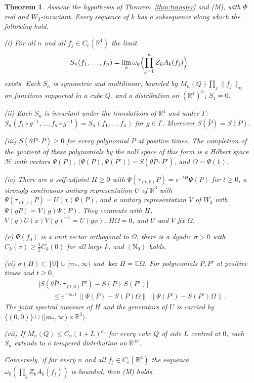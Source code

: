 \documentclass[aps,prd,twocolumn,superscriptaddress,nofootinbib,longbibliography,floatfix,amsmath,amssymb,10pt]{revtex4-2}
\newtheorem{theorem}{Theorem}
\theoremstyle{definition}
\theoremstyle{remark}
\newcommand{\R}{\mathbb{R}}
\newcommand{\C}{\mathbb{C}}
\newcommand{\ip}[2]{\langle #1,#2\rangle}
\begin{document}
\begin{theorem}\label{thm:osaxioms}
Assume the hypothesis of Theorem~\textup{\ref{thm:transfer}} and
\textup{(M)}, with $\Phi$ real and $W_3$-invariant. Every sequence of $k$
has a subsequence along which the following hold.

\textup{(i)} For all $n$ and all $f_j\in C_c(\R^4)$ the limit
\[
S_n(f_1,\dots,f_n)=\lim_k\omega_k\Bigl(\prod_{j=1}^nZ_kA_k(f_j)\Bigr)
\]
exists. Each $S_n$ is symmetric and multilinear, bounded by
$M_n(Q)\prod_j\|f_j\|_\infty$ on functions supported in a cube $Q$, and a
distribution on $(\R^4)^n$; $S_1=0$.

\textup{(ii)} Each $S_n$ is invariant under the translations of $\R^4$ and
under $\Gamma$: $S_n(f_1\circ g^{-1},\dots,f_n\circ g^{-1})=S_n(f_1,\dots,
f_n)$ for $g\in\Gamma$. Moreover $S(\bar P)=\overline{S(P)}$.

\textup{(iii)} $S(\theta\bar P\cdot P)\ge0$ for every polynomial $P$ at
positive times. The completion of the quotient of these polynomials by the
null space of this form is a Hilbert space $\mathcal H$ with vectors
$\Psi(P)$, $\ip{\Psi(P)}{\Psi(P')}=S(\theta\bar P\cdot P')$, and
$\Omega=\Psi(1)$.

\textup{(iv)} There are a self-adjoint $H\ge0$ with $\Psi(\tau_{(t,0)}P)=
e^{-tH}\Psi(P)$ for $t\ge0$, a strongly continuous unitary representation
$U$ of $\R^3$ with $\Psi(\tau_{(0,x)}P)=U(x)\Psi(P)$, and a unitary
representation $V$ of $W_3$ with $\Psi(gP)=V(g)\Psi(P)$. They commute with
$H$, $V(g)U(x)V(g)^{-1}=U(gx)$, $H\Omega=0$, and $U$ and $V$ fix $\Omega$.

\textup{(v)} $\Psi(f_0)$ is a unit vector orthogonal to $\Omega$, there is a
dyadic $\sigma>0$ with $C_k(\sigma)\ge\frac12C_k(0)$ for all large $k$, and
$(\mathrm N_0)$ holds.

\textup{(vi)} $\sigma(H)\subset\{0\}\cup[m_*,\infty)$ and $\ker H=\C\Omega$.
For polynomials $P,P'$ at positive times and $t\ge0$,
\[
\begin{split}
&\bigl|S(\theta\bar P\cdot\tau_{(t,0)}P')-\overline{S(P)}\,S(P')\bigr|\\
&\qquad\le e^{-m_*t}\,\|\Psi(P)-S(P)\Omega\|\,\|\Psi(P')-S(P')\Omega\| .
\end{split}
\]
The joint spectral measure of $H$ and the generators of $U$ is carried by
$\{(0,0)\}\cup\bigl([m_*,\infty)\times\R^3\bigr)$.

\textup{(vii)} If $M_n(Q)\le C_n(1+L)^{p_n}$ for every cube $Q$ of side $L$
centred at $0$, each $S_n$ extends to a tempered distribution on
$\R^{4n}$.

Conversely, if for every $n$ and all $f_j\in C_c(\R^4)$ the sequence
$\omega_k(\prod_jZ_kA_k(f_j))$ is bounded, then \textup{(M)} holds.
\end{theorem}
\end{document}
